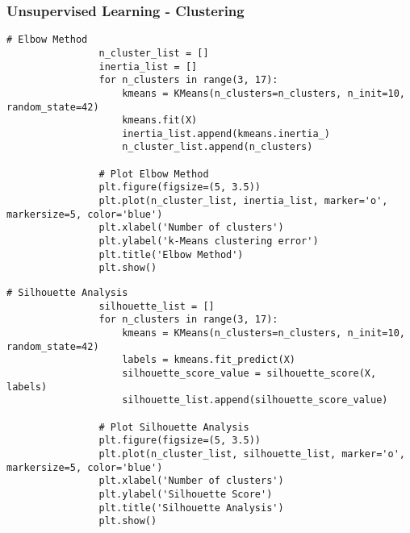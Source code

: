         \subsubsection{Unsupervised Learning - Clustering}

            \begin{lstlisting}[caption={Elbow Method for k-Means Clustering}, label={lst:elbow_method}]
                # Elbow Method
                n_cluster_list = []
                inertia_list = []
                for n_clusters in range(3, 17):
                    kmeans = KMeans(n_clusters=n_clusters, n_init=10, random_state=42)
                    kmeans.fit(X)
                    inertia_list.append(kmeans.inertia_)
                    n_cluster_list.append(n_clusters)
                
                # Plot Elbow Method
                plt.figure(figsize=(5, 3.5))
                plt.plot(n_cluster_list, inertia_list, marker='o', markersize=5, color='blue')
                plt.xlabel('Number of clusters')
                plt.ylabel('k-Means clustering error')
                plt.title('Elbow Method')
                plt.show()
            \end{lstlisting}

            \begin{lstlisting}[caption={Silhouette Analysis for k-Means Clustering}, label={lst:silhouette_analysis}]
                # Silhouette Analysis
                silhouette_list = []
                for n_clusters in range(3, 17):
                    kmeans = KMeans(n_clusters=n_clusters, n_init=10, random_state=42)
                    labels = kmeans.fit_predict(X)
                    silhouette_score_value = silhouette_score(X, labels)
                    silhouette_list.append(silhouette_score_value)
                
                # Plot Silhouette Analysis
                plt.figure(figsize=(5, 3.5))
                plt.plot(n_cluster_list, silhouette_list, marker='o', markersize=5, color='blue')
                plt.xlabel('Number of clusters')
                plt.ylabel('Silhouette Score')
                plt.title('Silhouette Analysis')
                plt.show()
            \end{lstlisting}

